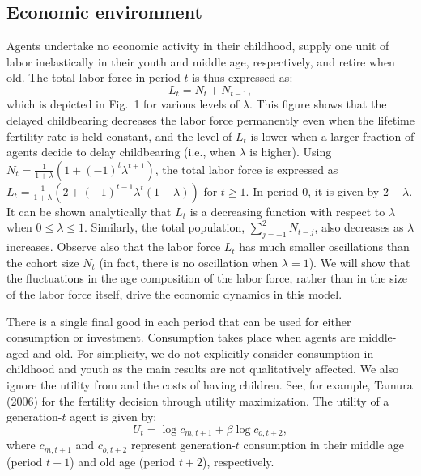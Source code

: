 \documentclass{MBE}%
\begin{document}
{\subsection{Economic environment}


Agents undertake no economic activity in their childhood, supply one unit of
labor inelastically in their youth and middle age, respectively, and retire
when old. The total labor force in period $t$ is thus expressed as:
\begin{equation}
L_{t}=N_{t}+N_{t-1}, \label{eq:labor}%
\end{equation}
which is depicted in Fig.~1 for various levels of $\lambda$. This figure shows that the delayed
childbearing decreases the labor force permanently even when the lifetime fertility rate is held
constant, and the level of $L_{t}$ is lower when a larger fraction of agents decide to delay
childbearing (i.e., when $\lambda$ is higher). {Using $N_{t}=\frac {1}{1+\lambda}\left( 1+\left(
-1\right)  ^{t}\lambda^{t+1}\right)  $, the total labor force is expressed as $L_{t}=
\frac{1}{1+\lambda}\left(  2+\left( -1\right)  ^{t-1}\lambda^{t}\left(  1-\lambda\right)  \right)
$ for $t\geq1$. In period 0, it is given by $2-\lambda$. It can be shown analytically that $L_{t}$
is a decreasing function with respect to $\lambda$ when $0\leq \lambda\leq1$. Similarly, the
total population, ${\textstyle\sum \nolimits_{j=-1}^{2}} N_{t-j}$, also decreases as
$\lambda$ increases.} Observe also that the labor force $L_{t}$ has much smaller oscillations than
the cohort size $N_{t}$ (in fact, there is no oscillation when $\lambda=1$). We will show that the
fluctuations in the age composition of the labor force, rather than in the size of the labor force
itself, drive the economic dynamics in this model.



There is a single final good in each period that can be used for either consumption or investment.
Consumption takes place when agents are middle-aged and old. {For simplicity, we do not explicitly
consider consumption in childhood and youth as the main results are not qualitatively affected. We
also ignore the utility from and the costs of having children. See, for example, Tamura (2006) for
the fertility decision through utility maximization.} The utility of a generation-$t$ agent is
given by:
\begin{equation}
U_{t}= \log c_{m,t+1}+\beta\log c_{o,t+2}, \label{eq:U}%
\end{equation}
where $c_{m,t+1}$ and $c_{o,t+2}$ represent generation-$t$ consumption in
their middle age (period $t+1$) and old age (period $t+2$), respectively.

}
\end{document}
